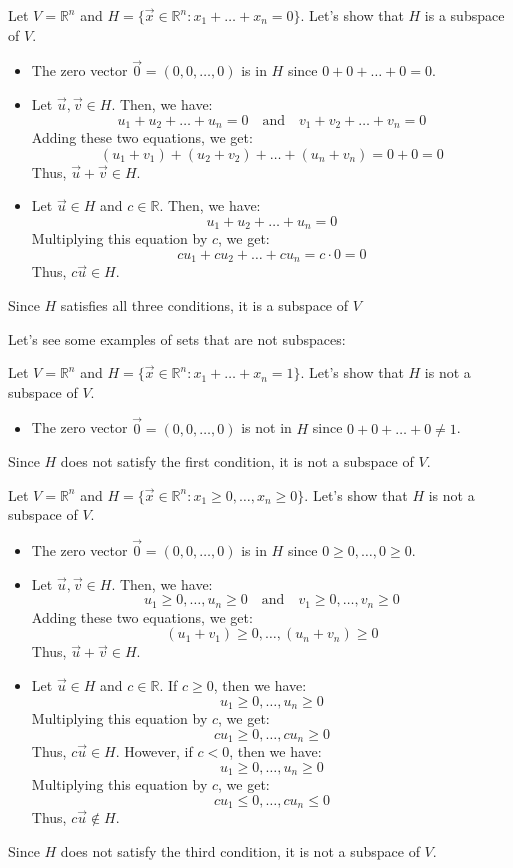 \begin{eg}
    Let $V = \mathbb{R}^n$ and $H = \{\vec{x} \in \mathbb{R}^n : x_1 + \ldots + x_n = 0\}$. Let's show that $H$ is a subspace of $V$.
    \begin{itemize}[itemsep=1pt,label=$\circ$]
        \item The zero vector $\vec{0} = (0, 0, \ldots, 0)$ is in $H$ since $0 + 0 + \ldots + 0 = 0$.
        \item Let $\vec{u}, \vec{v} \in H$. Then, we have:
        \[ u_1 + u_2 + \ldots + u_n = 0 \quad \text{and} \quad v_1 + v_2 + \ldots + v_n = 0 \]
        Adding these two equations, we get:
        \[(u_1 + v_1) + (u_2 + v_2) + \ldots + (u_n + v_n) = 0 + 0 = 0\]
        Thus, $\vec{u} + \vec{v} \in H$.
        \item Let $\vec{u} \in H$ and $c \in \mathbb{R}$. Then, we have:
        \[u_1 + u_2 + \ldots + u_n = 0\]
        Multiplying this equation by $c$, we get:
        \[c u_1 + c u_2 + \ldots + c u_n = c \cdot 0 = 0\]
        Thus, $c \vec{u} \in H$.
    \end{itemize}
    Since $H$ satisfies all three conditions, it is a subspace of $V$
\end{eg}
Let's see some examples of sets that are not subspaces:
\begin{eg}
    Let $V = \mathbb{R}^n$ and $H = \{\vec{x} \in \mathbb{R}^n : x_1 + \ldots + x_n = 1\}$. Let's show that $H$ is not a subspace of $V$.
    \begin{itemize}[itemsep=1pt,label=$\circ$]
        \item The zero vector $\vec{0} = (0, 0, \ldots, 0)$ is not in $H$ since $0 + 0 + \ldots + 0 \neq 1$.
    \end{itemize}
    Since $H$ does not satisfy the first condition, it is not a subspace of $V$.
\end{eg}
\begin{eg}
    Let $V = \mathbb{R}^n$ and $H = \{\vec{x} \in \mathbb{R}^n : x_1 \geq 0, \ldots, x_n \geq 0\}$. Let's show that $H$ is not a subspace of $V$.
    \begin{itemize}[itemsep=1pt,label=$\circ$]
        \item The zero vector $\vec{0} = (0, 0, \ldots, 0)$ is in $H$ since $0 \geq 0, \ldots, 0 \geq 0$.
        \item Let $\vec{u}, \vec{v} \in H$. Then, we have:
        \[ u_1 \geq 0, \ldots, u_n \geq 0 \quad \text{and} \quad v_1 \geq 0, \ldots, v_n \geq 0 \]
        Adding these two equations, we get:
        \[(u_1 + v_1) \geq 0, \ldots, (u_n + v_n) \geq 0\]
        Thus, $\vec{u} + \vec{v} \in H$.
        \item Let $\vec{u} \in H$ and $c \in \mathbb{R}$. If $c \geq 0$, then we have:
        \[u_1 \geq 0, \ldots, u_n \geq 0\]
        Multiplying this equation by $c$, we get:
        \[c u_1 \geq 0, \ldots, c u_n \geq 0\]
        Thus, $c \vec{u} \in H$. However, if $c < 0$, then we have:
        \[u_1 \geq 0, \ldots, u_n \geq 0\]
        Multiplying this equation by $c$, we get:
        \[c u_1 \leq 0, \ldots, c u_n \leq 0\]
        Thus, $c \vec{u} \notin H$.
    \end{itemize}
    Since $H$ does not satisfy the third condition, it is not a subspace of $V$.
\end{eg}
